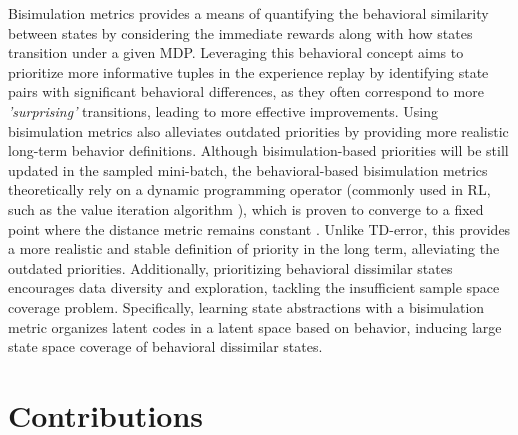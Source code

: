 Bisimulation metrics \cite{ferns2004metrics, ferns2011bisimulation, ferns2014bisimulation, castro2020scalable} provides a means of quantifying the behavioral similarity between states by considering the immediate rewards along with how states transition under a given MDP. Leveraging this behavioral concept aims to prioritize more informative tuples in the experience replay by identifying state pairs with significant behavioral differences, as they often correspond to more \textit{'surprising'} transitions, leading to more effective improvements. Using bisimulation metrics also alleviates outdated priorities by providing more realistic long-term behavior definitions. Although bisimulation-based priorities will be still updated in the sampled mini-batch, the behavioral-based bisimulation metrics theoretically rely on a dynamic programming operator (commonly used in RL, such as the value iteration algorithm \cite{sutton2018reinforcement}), which is proven to converge to a fixed point where the distance metric remains constant \cite{castro2020scalable, castro2021mico}. Unlike TD-error, this provides a more realistic and stable definition of priority in the long term, alleviating the outdated priorities. Additionally, prioritizing behavioral dissimilar states encourages data diversity and exploration, tackling the insufficient sample space coverage problem. Specifically, learning state abstractions with a bisimulation metric organizes latent codes in a latent space based on behavior, inducing large state space coverage of behavioral dissimilar states. 

\section{Contributions}

